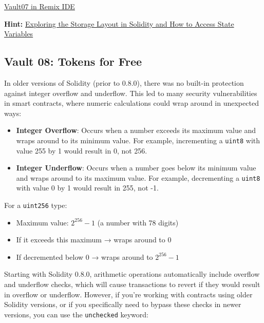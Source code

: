 \documentclass[12pt]{article}
\begin{document}
\medskip
\noindent
\href{https://remix.ethereum.org/?#activate=solidity&url=https://github.com/radovluk/unbreakable-vault/contracts/Vault07.sol&lang=en&optimize=false&runs=200&evmVersion=null&version=soljson-v0.8.28+commit.7893614a.js}{Vault07 in Remix IDE}

\medskip
\noindent
\textbf{Hint:} \href{https://medium.com/@flores.eugenio03/exploring-the-storage-layout-in-solidity-and-how-to-access-state-variables-bf2cbc6f8018}{Exploring the Storage Layout in Solidity and How to Access State Variables}

\subsection*{Vault 08: Tokens for Free}

In older versions of Solidity (prior to 0.8.0), there was no built-in protection against integer overflow and underflow. This led to many security vulnerabilities in smart contracts, where numeric calculations could wrap around in unexpected ways:

\begin{itemize}
    \item \textbf{Integer Overflow}: Occurs when a number exceeds its maximum value and wraps around to its minimum value. For example, incrementing a \texttt{uint8} with value 255 by 1 would result in 0, not 256.
    \item \textbf{Integer Underflow}: Occurs when a number goes below its minimum value and wraps around to its maximum value. For example, decrementing a \texttt{uint8} with value 0 by 1 would result in 255, not -1.
\end{itemize}

\noindent
For a \texttt{uint256} type:
\begin{itemize}
    \item Maximum value: $2^{256} - 1$ (a number with 78 digits)
    \item If it exceeds this maximum → wraps around to 0
    \item If decremented below 0 → wraps around to $2^{256} - 1$
\end{itemize}

\noindent
Starting with Solidity 0.8.0, arithmetic operations automatically include overflow and underflow checks, which will cause transactions to revert if they would result in overflow or underflow. However, if you're working with contracts using older Solidity versions, or if you specifically need to bypass these checks in newer versions, you can use the \texttt{unchecked} keyword:
\end{document}
